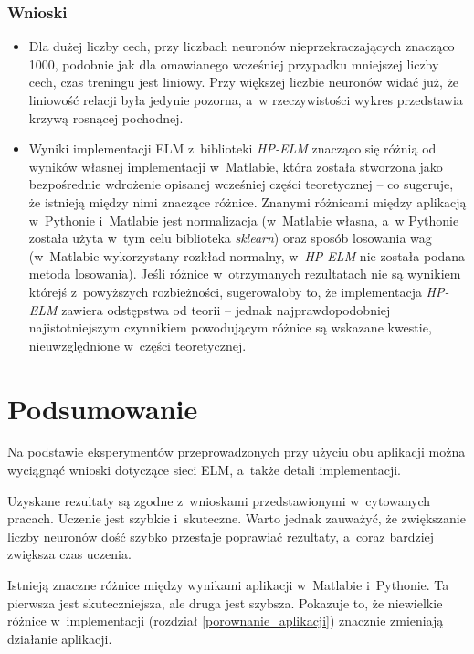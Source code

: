 \documentclass[pl]{minipw} %
\begin{document}
\subsection{Wnioski}
\begin{itemize}
\item Dla dużej liczby cech, przy liczbach neuronów nieprzekraczających znacząco 1000, podobnie jak dla omawianego wcześniej przypadku mniejszej liczby cech, czas treningu jest liniowy. Przy większej liczbie neuronów widać już, że liniowość relacji była jedynie pozorna, a~w rzeczywistości wykres przedstawia krzywą rosnącej pochodnej.
\item Wyniki implementacji ELM z~biblioteki \textit{HP-ELM} znacząco się różnią od wyników własnej implementacji w~Matlabie, która została stworzona jako bezpośrednie wdrożenie opisanej wcześniej części teoretycznej -- co sugeruje, że istnieją między nimi znaczące różnice. Znanymi różnicami między aplikacją w~Pythonie i~Matlabie jest normalizacja (w~Matlabie własna, a~w Pythonie została użyta w~tym celu biblioteka \textit{sklearn}) oraz sposób losowania wag (w~Matlabie wykorzystany rozkład normalny, w~\textit{HP-ELM} nie została podana metoda losowania). Jeśli różnice w~otrzymanych rezultatach nie są wynikiem którejś z~powyższych rozbieżności, sugerowałoby to, że implementacja \textit{HP-ELM} zawiera odstępstwa od teorii -- jednak najprawdopodobniej najistotniejszym czynnikiem powodującym różnice są wskazane kwestie, nieuwzględnione w~części teoretycznej.
\end{itemize}
\label{wnioski-lasy}
\clearpage
\chapter*{Podsumowanie}
Na podstawie eksperymentów przeprowadzonych przy użyciu obu aplikacji można wyciągnąć wnioski dotyczące sieci ELM, a~także detali implementacji.

Uzyskane rezultaty są zgodne z~wnioskami przedstawionymi w~cytowanych pracach.
Uczenie jest szybkie i~skuteczne.
Warto jednak zauważyć, że zwiększanie liczby neuronów dość szybko przestaje poprawiać rezultaty, a~coraz bardziej zwiększa czas uczenia.

Istnieją znaczne różnice między wynikami aplikacji w~Matlabie i~Pythonie. Ta pierwsza jest skuteczniejsza, ale druga jest szybsza. Pokazuje to, że niewielkie różnice w~implementacji (rozdział \ref{porownanie_aplikacji}) znacznie zmieniają działanie aplikacji.
\end{document}
